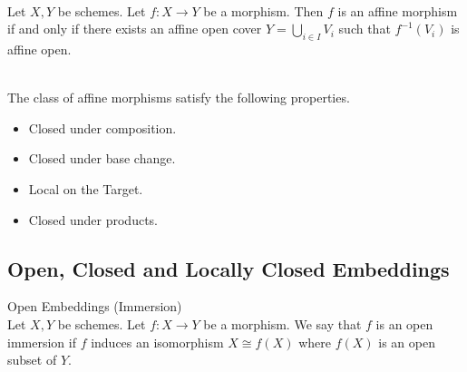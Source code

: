 \documentclass[a4paper]{article}
\begin{document}
\begin{lmm}{}{}\\
Let $X,Y$ be schemes. Let $f:X\to Y$ be a morphism. Then $f$ is an affine morphism if and only if there exists an affine open cover $Y=\bigcup_{i\in I}V_i$ such that $f^{-1}(V_i)$ is affine open. 
\end{lmm}

\begin{lmm}{}{}\\
The class of affine morphisms satisfy the following properties. 
\begin{itemize}
\item Closed under composition. 
\item Closed under base change. 
\item Local on the Target. 
\item Closed under products. 
\end{itemize}
\end{lmm}

\subsection{Open, Closed and Locally Closed Embeddings}
\begin{defn}{Open Embeddings (Immersion)}{}\\
Let $X,Y$ be schemes. Let $f:X\to Y$ be a morphism. We say that $f$ is an open immersion if $f$ induces an isomorphism $X\cong f(X)$ where $f(X)$ is an open subset of $Y$. 
\end{defn}
\end{document}
